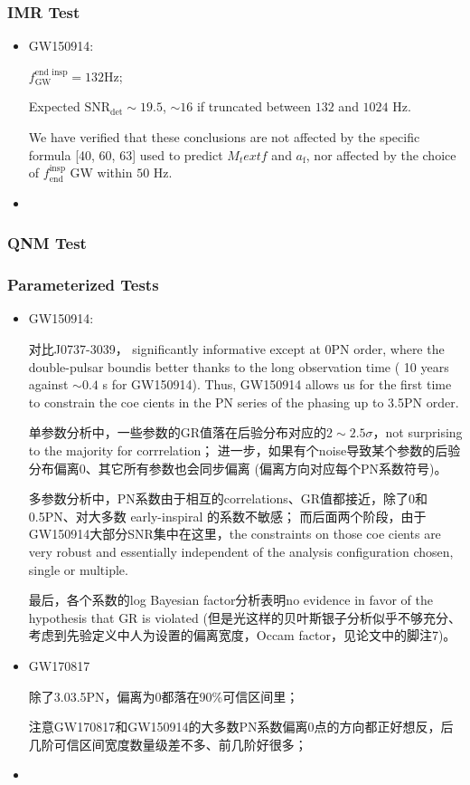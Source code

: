 \documentclass[CJK]{paper}  %
\begin{document}
\subsubsection{IMR Test}

\begin{itemize}
	\item[1. ] GW150914\cite{test_GR_GW150914}: 
		\par $f_\text{GW}^\text{end insp} = 132 \text{Hz}$;
		\par Expected $\text{SNR}_\text{det} \sim 19.5$, $\sim 16$ if truncated between $132$ and $1024$ Hz.
		\par We have verified that these conclusions are not affected by the specific formula [40, 60, 63] used to predict $M_text{f}$ and $a_\text{f}$, nor affected by the choice of $f_\text{end}^\text{insp}$ GW within $50$ Hz.
	\item[2. ]
\end{itemize}


\subsubsection{QNM Test}


\subsubsection{Parameterized Tests}
\begin{itemize}
	\item[1. ] GW150914\cite{test_GR_GW150914}: 
		\par 对比J0737-3039， significantly informative except at 0PN order, where the double-pulsar
		boundis better thanks to the long observation time ( 10 years
		against $\sim 0.4$ s for GW150914). Thus, GW150914 allows us
		for the first time to constrain the coe cients in the PN series
		of the phasing up to 3.5PN order.
		\par 单参数分析中，一些参数的GR值落在后验分布对应的$2 \sim 2.5\sigma$，not surprising to the majority for corrrelation；
		进一步，如果有个noise导致某个参数的后验分布偏离0、其它所有参数也会同步偏离 (偏离方向对应每个PN系数符号)。
		\par 多参数分析中，PN系数由于相互的correlations、GR值都接近，除了0和0.5PN、对大多数 early-inspiral 的系数不敏感；
		而后面两个阶段，由于GW150914大部分SNR集中在这里，the constraints on those coe cients are very
		robust and essentially independent of the analysis configuration
		chosen, single or multiple.
		\par 最后，各个系数的log Bayesian factor分析表明no evidence in favor of the hypothesis that GR is violated
		(但是光这样的贝叶斯银子分析似乎不够充分、考虑到先验定义中人为设置的偏离宽度，Occam factor，见论文中的脚注7)。
	\item[2. ] GW170817\cite{test_GR_GW170817}
		\par 除了3.03.5PN，偏离为0都落在90\%可信区间里；
		\par 注意GW170817和GW150914的大多数PN系数偏离0点的方向都正好想反，后几阶可信区间宽度数量级差不多、前几阶好很多；

	\item[] 
\end{itemize}
\end{document}
